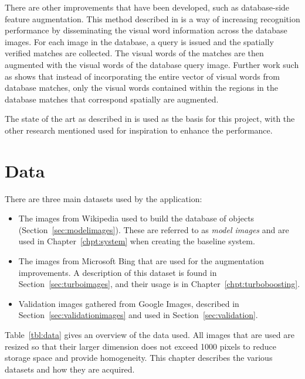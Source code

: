 \documentclass[11pt, onecolumn, a4paper, final]{report} %
\begin{document}
There are other improvements that have been developed, such as database-side feature augmentation. This method described in \cite{turcot09} is a way of  increasing recognition performance by disseminating the visual word information across the database images. For each image in the database, a query is issued and the spatially verified matches are collected. The visual words of the matches are then augmented with the visual words of the database query image. Further work such as \cite{rootsift12} shows that instead of incorporating the entire vector of visual words from database matches, only the visual words contained within the regions in the database matches that correspond spatially are augmented. 

The state of the art as described in \cite{philbin2007} is used as the basis for this project, with the other research mentioned used for inspiration to enhance the performance.

\chapter{Data}
\label{chpt:data}
There are three main datasets used by the application:

\begin{itemize}
\item The images from Wikipedia used to build the database of objects (Section~\ref{sec:modelimages}). These are referred to as \emph{model images} and are used in Chapter~\ref{chpt:system} when creating the baseline system.

\item The images from Microsoft Bing that are used for the augmentation improvements. A description of this dataset is found in Section~\ref{sec:turboimages}, and their usage is in Chapter~\ref{chpt:turboboosting}.

\item Validation images gathered from Google Images, described in Section~\ref{sec:validationimages} and used in Section~\ref{sec:validation}.
\end{itemize}

Table~\ref{tbl:data} gives an overview of the data used. All images that are used are resized so that their larger dimension does not exceed 1000 pixels to reduce storage space and provide homogeneity. This chapter describes the various datasets and how they are acquired. 
\end{document}
